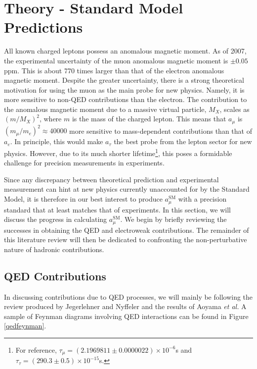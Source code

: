 \documentclass{article}
\numberwithin{equation}{section} %
\begin{document}



\section{Theory - Standard Model Predictions}\label{th}

All known charged leptons possess an anomalous magnetic moment. As of 2007, the experimental uncertainty of the muon anomalous magnetic moment is $\pm0.05$ppm. This is about 770 times larger than that of the electron anomalous magnetic moment\cite{millerg2}. Despite the greater uncertainty, there is a strong theoretical motivation for using the muon as the main probe for new physics. Namely, it is more sensitive to non-QED contributions than the electron. The contribution to the anomalous magnetic moment due to a massive virtual particle, $M_X$, scales as $(m/M_X)^2$, where $m$ is the mass of the charged lepton. This means that $a_\mu$ is $(m_\mu/m_e)^2\approx 40000$ more sensitive to mass-dependent contributions than that of $a_e$\cite{fermilab}. In principle, this would make $a_\tau$ the best probe from the lepton sector for new physics. However, due to its much shorter lifetime\footnote{For reference, $\tau_\mu=(2.1969811 \pm 0.0000022)×10^{-6}$s and $\tau_\tau=(290.3 \pm 0.5) × 10^{-15}$s\cite{pdg}.}, this poses a formidable challenge for precision measurements in experiments\cite{fermilab}.

Since any discrepancy between theoretical prediction and experimental measurement can hint at new physics currently unaccounted for by the Standard Model, it is therefore in our best interest to produce $a_\mu^\mathrm{SM}$ with a precision standard that at least matches that of experiments. In this section, we will discuss the progress in calculating $a_\mu^\mathrm{SM}$. We begin by briefly reviewing the successes in obtaining the QED and electroweak contributions. The remainder of this literature review will then be dedicated to confronting the non-perturbative nature of hadronic contributions.

\subsection{QED Contributions}

In discussing contributions due to QED processes, we will mainly be following the review produced by Jegerlehner and Nyffeler\cite{lehnerg2} and the results of Aoyama \textit{et al.}\cite{aoyama} A sample of Feynman diagrams involving QED interactions can be found in Figure \ref{qedfeynman}.
\end{document}
